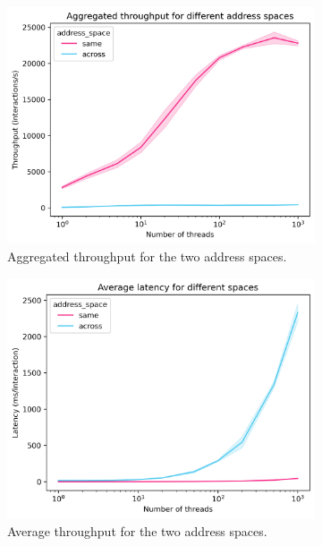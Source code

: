 \documentclass{article}
\begin{document}
\begin{figure}
	\centering
	\begin{subfigure}[b]{0.48\textwidth}
		\includegraphics[width=\textwidth]{plots/throughput_all}
		\caption{Aggregated throughput for the two address spaces.}
		\label{fig:throughput-all}
	\end{subfigure}
	\hfill
		\begin{subfigure}[b]{0.48\textwidth}
		\includegraphics[width=\textwidth]{plots/latency_all}
		\caption{Average throughput for the two address spaces.}
		\label{fig:latency_all}
	\end{subfigure}
	\begin{subfigure}[b]{0.48\textwidth}

\end{subfigure}
\end{figure}
\end{document}
